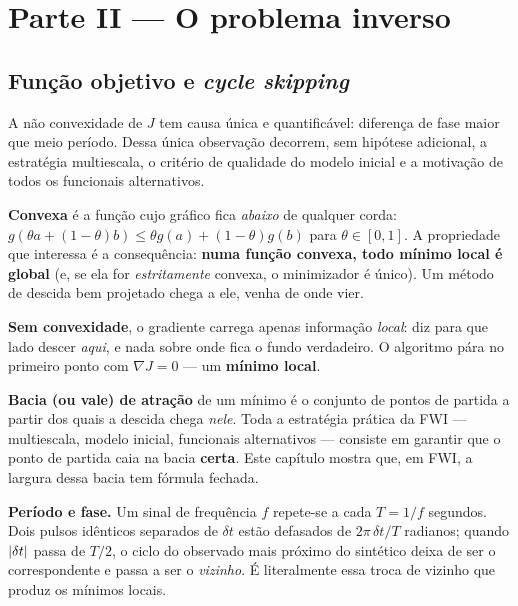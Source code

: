 \documentclass[11pt,a4paper,oneside]{report}
\begin{document}
\part*{\centering\color{azulfwi} Parte II --- O problema inverso}

\chapter{Fun\c{c}\~ao objetivo e \emph{cycle skipping}}
\label{cap:misfit}

\begin{ideia}
A n\~ao convexidade de $J$ tem causa \'unica e quantific\'avel: diferen\c{c}a
de fase maior que meio per\'iodo. Dessa \'unica observa\c{c}\~ao decorrem, sem
hip\'otese adicional, a estrat\'egia multiescala, o crit\'erio de qualidade do
modelo inicial e a motiva\c{c}\~ao de todos os funcionais alternativos.
\end{ideia}

\begin{matematica}
\textbf{Convexa} \'e a fun\c{c}\~ao cujo gr\'afico fica \emph{abaixo} de
qualquer corda: $g(\theta a + (1-\theta)b) \le \theta g(a) + (1-\theta)g(b)$
para $\theta\in[0,1]$. A propriedade que interessa \'e a consequ\^encia:
\textbf{numa fun\c{c}\~ao convexa, todo m\'inimo local \'e global} (e, se ela
for \emph{estritamente} convexa, o minimizador \'e \'unico). Um m\'etodo de
descida bem projetado chega a ele, venha de onde vier.

\textbf{Sem convexidade}, o gradiente carrega apenas informa\c{c}\~ao
\emph{local}: diz para que lado descer \emph{aqui}, e nada sobre onde fica o
fundo verdadeiro. O algoritmo p\'ara no primeiro ponto com $\nabla J = 0$ ---
um \textbf{m\'inimo local}.

\textbf{Bacia (ou vale) de atra\c{c}\~ao} de um m\'inimo \'e o conjunto de
pontos de partida a partir dos quais a descida chega \emph{nele}. Toda a
estrat\'egia pr\'atica da FWI --- multiescala, modelo inicial, funcionais
alternativos --- consiste em garantir que o ponto de partida caia na bacia
\textbf{certa}. Este cap\'itulo mostra que, em FWI, a largura dessa bacia tem
f\'ormula fechada.

\textbf{Per\'iodo e fase.} Um sinal de frequ\^encia $f$ repete-se a cada
$T = 1/f$ segundos. Dois pulsos id\^enticos separados de $\delta t$ est\~ao
defasados de $2\pi\,\delta t/T$ radianos; quando $\lvert \delta t \rvert$ passa de
$T/2$, o ciclo do observado mais pr\'oximo do sint\'etico deixa de ser o
correspondente e passa a ser o \emph{vizinho}. \'E literalmente essa troca de
vizinho que produz os m\'inimos locais.
\end{matematica}
\end{document}
